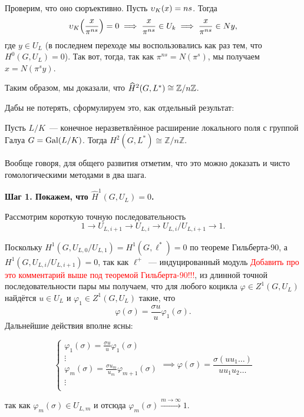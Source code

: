 	 Проверим, что оно сюръективно. Пусть $\upsilon_K(x) = ns$. Тогда 
	 \[
	  	\v_K\lr*{\frac{x}{\pi^{ns}}} = 0 \implies \frac{x}{\pi^{ns}} \in U_k \implies \frac{x}{\pi^{ns}} \in Ny,
	  \] 
	  где $y \in U_L$ (в последнем переходе мы воспользовались как раз тем, что $H^0(G, U_L) = 0$). Так вот, тогда, так как $\pi^{ns} = N(\pi^s)$, мы получаем $x = N(\pi^s y)$.

	  Таким образом, мы доказали, что $\widehat{H}^{2}(G, L^*) \cong \mathbb{Z}/n\mathbb{Z}$. 

   Дабы не потерять, сформулируем это, как отдельный результат: 

	  \begin{theorem}\label{nerazvetv_H^2} 
	  	Пусть $L/K$~--- конечное неразветвлённое расширение локального поля с группой Галуа $G = \operatorname{Gal}(L/K)$. Тогда $H^2(G, L^*) \cong \mathbb{Z}/n \mathbb{Z}$.
	  \end{theorem}

	  Вообще говоря, для общего развития отметим, что это можно доказать и чисто гомологическими методами в два шага. 

	  \noindent\bf{Шаг 1.} Покажем, что $\widehat{H}^1(G, U_L) = 0$. 

	  Рассмотрим короткую точную последовательность 
	  \[
	  	1 \to U_{L, i + 1} \to U_{L, i} \to U_{L, i}/U_{L, i + 1} \to 1.
	  \]

	  Поскольку $H^{1}(G, U_{L,0}/U_{L, 1}) = H^1(G, \ell^*) = 0$ по теореме Гильберта-90, а $H^1(G, U_{L, i}/U_{L, i + 1}) = 0$, так как $\ell^+$~--- индуцированный модуль \textcolor{red}{Добавить про это комментарий выше под теоремой Гильберта-90!!!}, из длинной точной последовательности пары мы получаем, что для любого коцикла $\varphi \in Z^1(G, U_L)$ найдётся $u \in U_L$ и $\varphi_1 \in Z^1(G, U_L)$ такие, что 
	  \[
	  	\varphi(\sigma) = \frac{\sigma u}{u} \varphi_1(\sigma).
	  \]
	  Дальнейшие действия вполне ясны: 

	  \[
	  	\begin{cases}
	  	 \varphi_1(\sigma) = \frac{\sigma u}{u} \varphi_{1}(\sigma) \\ \vdots \\ \varphi_{m} (\sigma) = \frac{\sigma u_m}{u_m} \varphi_{m + 1}(\sigma) \\ \vdots \\ \end{cases} \implies \varphi(\sigma) = \frac{\sigma(u u _1 \ldots)}{u u_1 u_2\ldots }
	  	 \]

	  	
	  так как $\varphi_m(\sigma) \in U_{L, m}$ и отсюда $\varphi_m(\sigma) \xrightarrow{m \to \infty} 1$. 

